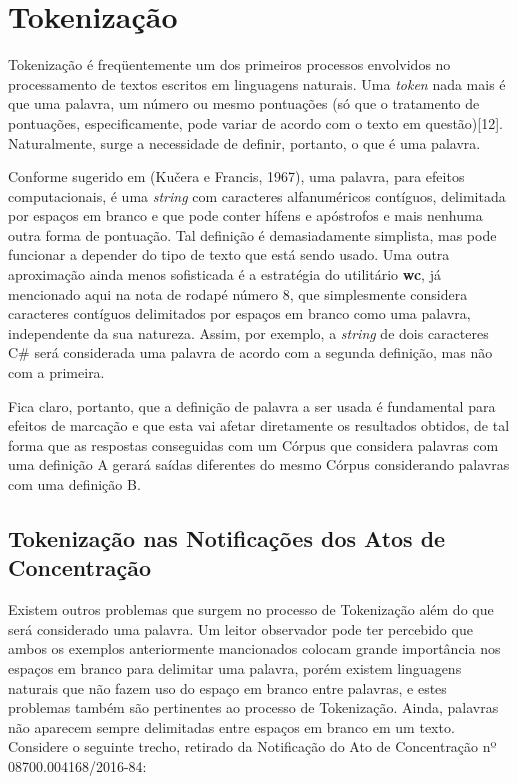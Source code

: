 \documentclass[11pt]{report}
\begin{document}
\section{Tokenização}

\indent\indent Tokenização é freqüentemente um dos primeiros processos envolvidos no processamento de textos escritos em linguagens naturais. Uma \textit{token} nada mais é que uma
palavra, um número ou mesmo pontuações (só que o tratamento de pontuações, especificamente, pode variar de acordo com o texto em questão)[12]. Naturalmente, surge a necessidade de
definir, portanto, o que é uma palavra.

Conforme sugerido em (Kučera e Francis, 1967), uma palavra, para efeitos computacionais, é uma \textit{string} com caracteres alfanuméricos
contíguos, delimitada por espaços em branco e que pode conter hífens e apóstrofos e mais nenhuma outra forma de pontuação. Tal definição é demasiadamente simplista,
mas pode funcionar a depender do tipo de texto que está sendo usado. Uma outra aproximação ainda menos sofisticada é a estratégia do utilitário \textbf{wc}, já mencionado
aqui na nota de rodapé número 8, que simplesmente considera caracteres contíguos delimitados por espaços em branco como uma palavra, independente da sua natureza. Assim, por exemplo,
a \textit{string} de dois caracteres C\# será considerada uma palavra de acordo com a segunda definição, mas não com a primeira.

Fica claro, portanto, que a definição de palavra a ser usada é fundamental para efeitos de marcação e que esta vai afetar diretamente os resultados obtidos, de tal forma que as
respostas conseguidas com um Córpus que considera palavras com uma definição A gerará saídas diferentes do mesmo Córpus considerando palavras com uma definição B.

\subsection{Tokenização nas Notificações dos Atos de Concentração}

\indent\indent Existem outros problemas que surgem no processo de Tokenização além do que será considerado uma palavra. Um leitor observador pode ter percebido que ambos os exemplos anteriormente
mancionados colocam grande importância nos espaços em branco para delimitar uma palavra, porém existem linguagens naturais que não fazem uso do espaço em branco entre palavras, e
estes problemas também são pertinentes ao processo de Tokenização. Ainda, palavras não aparecem sempre delimitadas entre espaços em branco em um texto. Considere o seguinte trecho,
retirado da Notificação do Ato de Concentração nº 08700.004168/2016-84:
\end{document}
